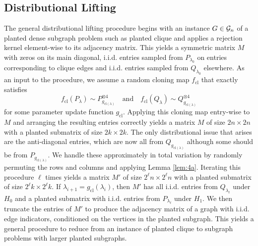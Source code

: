 \subsection{Distributional Lifting}

The general distributional lifting procedure begins with an instance $G \in \mathcal{G}_n$ of a planted dense subgraph problem such as planted clique and applies a rejection kernel element-wise to its adjacency matrix. This yields a symmetric matrix $M$ with zeros on its main diagonal, i.i.d. entries sampled from $P_{\lambda_0}$ on entries corresponding to clique edges and i.i.d. entries sampled from $Q_{\lambda_0}$ elsewhere. As an input to the procedure, we assume a random cloning map $f_{\text{cl}}$ that exactly satisfies
$$f_{\text{cl}}(P_\lambda) \sim P_{g_{\text{cl}(\lambda)}}^{\otimes 4} \quad \text{and} \quad f_{\text{cl}}(Q_\lambda) \sim Q_{g_{\text{cl}(\lambda)}}^{\otimes 4}$$
for some parameter update function $g_{\text{cl}}$. Applying this cloning map entry-wise to $M$ and arranging the resulting entries correctly yields a matrix $M$ of size $2n \times 2n$ with a planted submatrix of size $2k \times 2k$. The only distributional issue that arises are the anti-diagonal entries, which are now all from $Q_{g_{\text{cl}(\lambda)}}$ although some should be from $P_{g_{\text{cl}(\lambda)}}$. We handle these approximately in total variation by randomly permuting the rows and columns and applying Lemma \ref{lem:4a}. Iterating this procedure $\ell$ times yields a matrix $M'$ of size $2^\ell n \times 2^\ell n$ with a planted submatrix of size $2^\ell k \times 2^\ell k$. If $\lambda_{i+1} = g_{\text{cl}}(\lambda_i)$, then $M'$ has all i.i.d. entries from $Q_{\lambda_\ell}$ under $H_0$ and a planted submatrix with i.i.d. entries from $P_{\lambda_\ell}$ under $H_1$. We then truncate the entries of $M'$ to produce the adjacency matrix of a graph with i.i.d. edge indicators, conditioned on the vertices in the planted subgraph. This yields a general procedure to reduce from an instance of planted clique to subgraph problems with larger planted subgraphs.


